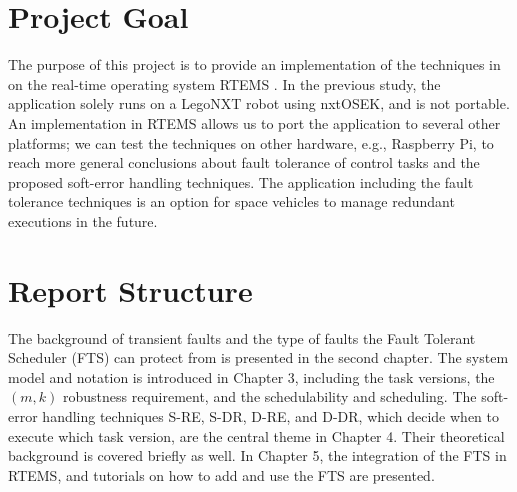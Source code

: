 \section{Project Goal}

The purpose of this project is to provide an implementation of the techniques in~\cite{Chen2016} on the real-time operating system RTEMS \cite{rtemsweb}. In the previous study, the application solely runs on a LegoNXT robot using nxtOSEK, and is not portable. An implementation in RTEMS allows us to port the application to several other platforms; we can test the techniques on  other hardware, e.g., Raspberry Pi, to reach more general conclusions about fault tolerance of control tasks and the proposed soft-error handling techniques. The application including the fault tolerance techniques is an option for space vehicles to manage redundant executions in the future.   

\section{Report Structure}
The background of transient faults and the type of faults the Fault Tolerant Scheduler (FTS) can protect from is presented in the second chapter.
The system model and notation is introduced in Chapter 3, including the task versions, the $(m,k)$ robustness requirement, and the schedulability and scheduling. 
The soft-error handling techniques S-RE, S-DR, D-RE, and D-DR, which decide when to execute which task version, are the central theme in Chapter 4. Their theoretical background is covered briefly as well.
In Chapter 5, the integration of the FTS in RTEMS, and tutorials on how to add and use the FTS are presented.
